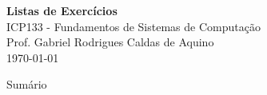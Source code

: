 \documentclass[a4paper,12pt]{article}
\begin{document}
\begin{titlepage}
    \centering
    \vspace*{5cm}
    {\Huge \textbf{Listas de Exercícios}}\\[1cm]

    {\Large ICP133 -  Fundamentos de Sistemas de Computação}\\[0.5cm]
    {\large Prof. Gabriel Rodrigues Caldas de Aquino}\\[0.5cm]
    {\large \today}\\

\end{titlepage}

Sumário
\tableofcontents
\clearpage






\end{document}
